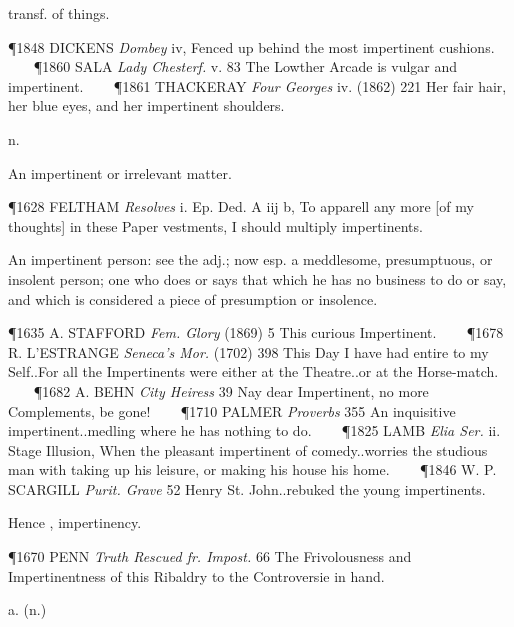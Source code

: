 \begin{description}[wide, labelwidth=!, labelindent=0pt]
\begin{myenumerate}
 transf. of things.

\P 1848 DICKENS  \textit{Dombey} iv, Fenced up behind the most impertinent cushions.    
\P 1860 SALA  \textit{Lady Chesterf.} v. 83 The Lowther Arcade is vulgar and impertinent.    
\P 1861 THACKERAY  \textit{Four Georges} iv. (1862) 221 Her fair hair, her blue eyes, and her impertinent shoulders.

 n.

 An impertinent or irrelevant matter.

\P 1628 FELTHAM  \textit{Resolves} i. Ep. Ded. A iij b, To apparell any more [of my thoughts] in these Paper vestments, I should multiply impertinents.

 An impertinent person: see the adj.; now esp. a meddlesome, presumptuous, or insolent person; one who does or says that which he has no business to do or say, and which is considered a piece of presumption or insolence.

\P 1635 A. STAFFORD  \textit{Fem. Glory} (1869) 5 This curious Impertinent.    
\P 1678 R. L'ESTRANGE  \textit{Seneca's Mor.} (1702) 398 This Day I have had entire to my Self..For all the Impertinents were either at the Theatre..or at the Horse-match.    
\P 1682 A. BEHN  \textit{City Heiress} 39 Nay dear Impertinent, no more Complements, be gone!    
\P 1710 PALMER  \textit{Proverbs} 355 An inquisitive impertinent..medling where he has nothing to do.    
\P 1825 LAMB  \textit{Elia Ser.} ii. Stage Illusion, When the pleasant impertinent of comedy..worries the studious man with taking up his leisure, or making his house his home.    
\P 1846 W. P. SCARGILL  \textit{Purit. Grave} 52 Henry St. John..rebuked the young impertinents.

\noindent Hence , impertinency.

\P 1670 PENN  \textit{Truth Rescued fr. Impost.} 66 The Frivolousness and Impertinentness of this Ribaldry to the Controversie in hand.
\end{myenumerate}


 a. (n.)

\noindent {}

\vspace{-0.3cm}


\end{description}
